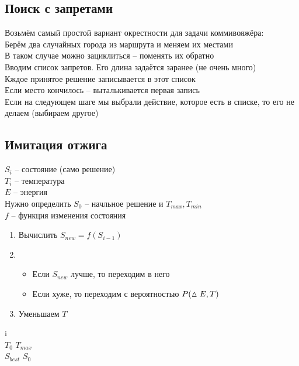 \subsection{Поиск с запретами}

Возьмём самый простой вариант окрестности для задачи коммивояжёра: \\
Берём два случайных города из маршрута и меняем их местами \\
В таком случае можно зациклиться -- поменять их обратно \\
Вводим список запретов. Его длина задаётся заранее (не очень много) \\
Кждое принятое решение записывается в этот список \\
Если место кончилось -- выталькивается первая запись \\
Если на следующем шаге мы выбрали действие, которое есть в списке, то его не делаем (выбираем другое)

\subsection{Имитация отжига}

$ S_i $ -- состояние (само решение) \\
$ T_i $ -- температура \\
$ E $ -- энергия \\
Нужно определить $ S_0 $ -- начльное решение и $ T_{max}, T_{min} $ \\
$ f $ -- функция изменения состояния

\begin{algorithm}
    \hfill
    \begin{enumerate}
        \item Вычислить $ S_{new} = f(S_{i - 1}) $
        \item
        \begin{itemize}
            \item Если $ S_{new} $ лучше, то переходим в него
            \item Если хуже, то переходим с вероятностью $ P(\vartriangle E, T) $
        \end{itemize}
        \item Уменьшаем $ T $
    \end{enumerate}
\end{algorithm}

\begin{algorithm2e}
    i  \\
    $ T_0 $ \Define $ T_{max} $ \\
    $ S_{best} $ \Define $ S_0 $ \\
\end{algorithm2e}

